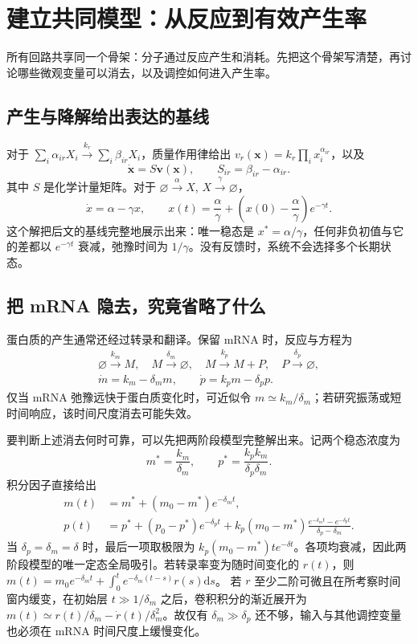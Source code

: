 \documentclass[11pt,a4paper,UTF8,fontset=fandol]{ctexart}
\newcommand{\dd}{\mathrm d}\newcommand{\R}{\mathbb R}\newcommand{\ssv}{\mathrm{ss}}
\begin{document}
\section{建立共同模型：从反应到有效产生率}
所有回路共享同一个骨架：分子通过反应产生和消耗。先把这个骨架写清楚，再讨论哪些微观变量可以消去，以及调控如何进入产生率。
\subsection{产生与降解给出表达的基线}
对于 $\sum_i\alpha_{ir}X_i\xrightarrow{k_r}\sum_i\beta_{ir}X_i$，质量作用律给出 $v_r(\bm x)=k_r\prod_i x_i^{\alpha_{ir}}$，以及
\begin{equation}\dot{\bm x}=S\bm v(\bm x),\qquad S_{ir}=\beta_{ir}-\alpha_{ir}.\end{equation}
其中 $S$ 是化学计量矩阵。对于 $\varnothing\xrightarrow{\alpha}X$, $X\xrightarrow{\gamma}\varnothing$，
\begin{equation}\dot x=\alpha-\gamma x,\qquad x(t)=\frac\alpha\gamma+\left(x(0)-\frac\alpha\gamma\right)e^{-\gamma t}.\end{equation}
这个解把后文的基线完整地展示出来：唯一稳态是 $x^*=\alpha/\gamma$，任何非负初值与它的差都以 $e^{-\gamma t}$ 衰减，弛豫时间为 $1/\gamma$。没有反馈时，系统不会选择多个长期状态。

\subsection{把 mRNA 隐去，究竟省略了什么}
蛋白质的产生通常还经过转录和翻译。保留 mRNA 时，反应与方程为
\begin{align}
\varnothing\xrightarrow{k_m}M,\quad M\xrightarrow{\delta_m}\varnothing,\quad M\xrightarrow{k_p}M+P,\quad P\xrightarrow{\delta_p}\varnothing,\\[-2pt]
\dot m=k_m-\delta_m m,\qquad\dot p=k_pm-\delta_p p.
\end{align}
仅当 mRNA 弛豫远快于蛋白质变化时，可近似令 $m\simeq k_m/\delta_m$；若研究振荡或短时间响应，该时间尺度消去可能失效。

要判断上述消去何时可靠，可以先把两阶段模型完整解出来。记两个稳态浓度为
\[
m^*=\frac{k_m}{\delta_m},\qquad p^*=\frac{k_pk_m}{\delta_p\delta_m}.
\]
积分因子直接给出
\begin{align}
m(t)&=m^*+(m_0-m^*)e^{-\delta_mt},\\
p(t)&=p^*+(p_0-p^*)e^{-\delta_pt}
 +k_p(m_0-m^*)\frac{e^{-\delta_mt}-e^{-\delta_pt}}{\delta_p-\delta_m}.
\end{align}
当 $\delta_p=\delta_m=\delta$ 时，最后一项取极限为 $k_p(m_0-m^*)te^{-\delta t}$。各项均衰减，因此两阶段模型的唯一定态全局吸引。若转录率变为随时间变化的 $r(t)$，则
$m(t)=m_0e^{-\delta_mt}+\int_0^t e^{-\delta_m(t-s)}r(s)\dd s$。
若 $r$ 至少二阶可微且在所考察时间窗内缓变，在初始层 $t\gg1/\delta_m$ 之后，卷积积分的渐近展开为
$m(t)\simeq r(t)/\delta_m-\dot r(t)/\delta_m^2$。故仅有 $\delta_m\gg\delta_p$ 还不够，输入与其他调控变量也必须在 mRNA 时间尺度上缓慢变化。
\end{document}
